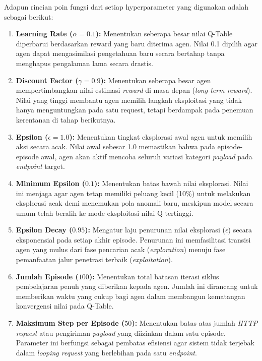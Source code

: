 Adapun rincian poin fungsi dari setiap hyperparameter yang digunakan adalah sebagai berikut:

\begin{enumerate}
    \item \textbf{Learning Rate ($\alpha = 0.1$):} Menentukan seberapa besar nilai Q-Table diperbarui berdasarkan reward yang baru diterima agen. Nilai 0.1 dipilih agar agen dapat mengasimilasi pengetahuan baru secara bertahap tanpa menghapus pengalaman lama secara drastis.
    \item \textbf{Discount Factor ($\gamma = 0.9$):} Menentukan seberapa besar agen mempertimbangkan nilai estimasi \textit{reward} di masa depan (\textit{long-term reward}). Nilai yang tinggi membantu agen memilih langkah eksploitasi yang tidak hanya menguntungkan pada satu request, tetapi berdampak pada penemuan kerentanan di tahap berikutnya.
    \item \textbf{Epsilon ($\epsilon = 1.0$):} Menentukan tingkat eksplorasi awal agen untuk memilih aksi secara acak. Nilai awal sebesar 1.0 memastikan bahwa pada episode-episode awal, agen akan aktif mencoba seluruh variasi kategori \textit{payload} pada \textit{endpoint} target.
    \item \textbf{Minimum Epsilon ($0.1$):} Menentukan batas bawah nilai eksplorasi. Nilai ini menjaga agar agen tetap memiliki peluang kecil (10\%) untuk melakukan eksplorasi acak demi menemukan pola anomali baru, meskipun model secara umum telah beralih ke mode eksploitasi nilai Q tertinggi.
    \item \textbf{Epsilon Decay ($0.95$):} Mengatur laju penurunan nilai eksplorasi ($\epsilon$) secara eksponensial pada setiap akhir episode. Penurunan ini memfasilitasi transisi agen yang mulus dari fase pencarian acak (\textit{exploration}) menuju fase pemanfaatan jalur penetrasi terbaik (\textit{exploitation}).
    \item \textbf{Jumlah Episode ($100$):} Menentukan total batasan iterasi siklus pembelajaran penuh yang diberikan kepada agen. Jumlah ini dirancang untuk memberikan waktu yang cukup bagi agen dalam membangun kematangan konvergensi nilai pada Q-Table.
    \item \textbf{Maksimum Step per Episode ($50$):} Menentukan batas atas jumlah \textit{HTTP request} atau pengiriman \textit{payload} yang diizinkan dalam satu episode. Parameter ini berfungsi sebagai pembatas efisiensi agar sistem tidak terjebak dalam \textit{looping request} yang berlebihan pada satu \textit{endpoint}.
\end{enumerate}

